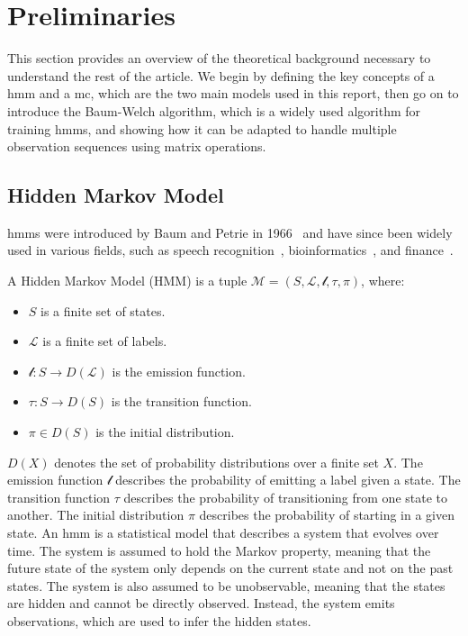\section{Preliminaries}\label{sec:preliminaries}
This section provides an overview of the theoretical background necessary to understand the rest of the article.
We begin by defining the key concepts of a \gls{hmm} and a \gls{mc}, which are the two main models used in this report, then go on to introduce the Baum-Welch algorithm, which is a widely used algorithm for training \glspl{hmm}, and showing how it can be adapted to handle multiple observation sequences using matrix operations.

\subsection{Hidden Markov Model}\label{subsec:hmm}
\glspl{hmm} were introduced by Baum and Petrie in 1966~\cite{baum1966statistical} and have since been widely used in various fields, such as speech recognition~\cite{chavan2013overview}, bioinformatics~\cite{ciocchetta2009bio}, and finance~\cite{mamon2007hidden}.
\begin{definition}
    A Hidden Markov Model (HMM) is a tuple $\mathcal{M} = (S, \mathcal{L}, \mathscr{l}, \tau,  \pi)$, where:
    \begin{itemize}
        \item $S$ is a finite set of states.
        \item $\mathcal{L}$ is a finite set of labels.
        \item $\mathscr{l}: S \rightarrow D(\mathcal{L})$ is the emission function.
        \item $\tau: S \rightarrow D(S)$ is the transition function.
        \item $\pi \in D(S)$ is the initial distribution.
    \end{itemize}
\end{definition}

$D(X)$ denotes the set of probability distributions over a  finite set $X$.
The emission function $\mathscr{l}$ describes the probability of emitting a label given a state.
The transition function $\tau$ describes the probability of transitioning from one state to another.
The initial distribution $\pi$ describes the probability of starting in a given state.
An \gls{hmm} is a statistical model that describes a system that evolves over time.
The system is assumed to hold the Markov property, meaning that the future state of the system only depends on the current state and not on the past states.
The system is also assumed to be unobservable, meaning that the states are hidden and cannot be directly observed.
Instead, the system emits observations, which are used to infer the hidden states.

